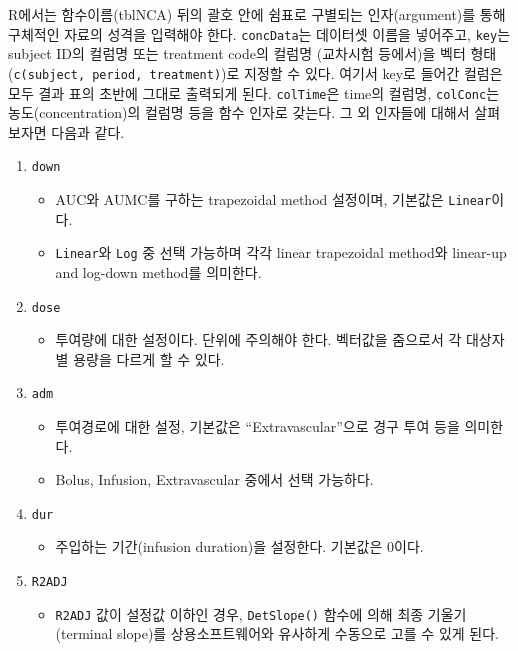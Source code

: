 \documentclass[
  11pt,
  krantz2, a4paper, twoside]{krantz}
\providecommand{\tightlist}{%
  \setlength{\itemsep}{0pt}\setlength{\parskip}{0pt}}
\theoremstyle{definition}
\theoremstyle{definition}
\theoremstyle{definition}
\theoremstyle{definition}
\theoremstyle{remark}
\begin{document}
R에서는 함수이름(tblNCA) 뒤의 괄호 안에 쉼표로 구별되는 인자(argument)를 통해 구체적인 자료의 성격을 입력해야 한다.
\texttt{concData}는 데이터셋 이름을 넣어주고, \texttt{key}는 subject ID의 컬럼명 또는 treatment code의 컬럼명 (교차시험 등에서)을 벡터 형태(\texttt{c(\textquotesingle{}subject\textquotesingle{},\ \textquotesingle{}period\textquotesingle{},\ \textquotesingle{}treatment\textquotesingle{})})로 지정할 수 있다. 여기서 key로 들어간 컬럼은 모두 결과 표의 초반에 그대로 출력되게 된다.
\texttt{colTime}은 time의 컬럼명, \texttt{colConc}는 농도(concentration)의 컬럼명 등을 함수 인자로 갖는다. 그 외 인자들에 대해서 살펴보자면 다음과 같다.

\begin{enumerate}
\def\labelenumi{\arabic{enumi}.}
\tightlist
\item
  \texttt{down}

  \begin{itemize}
  \tightlist
  \item
    AUC와 AUMC를 구하는 trapezoidal method 설정이며, 기본값은 \texttt{Linear}이다.
  \item
    \texttt{Linear}와 \texttt{Log} 중 선택 가능하며 각각 linear trapezoidal method와 linear-up and log-down method를 의미한다.
  \end{itemize}
\item
  \texttt{dose}

  \begin{itemize}
  \tightlist
  \item
    투여량에 대한 설정이다. 단위에 주의해야 한다. 벡터값을 줌으로서 각 대상자별 용량을 다르게 할 수 있다.
  \end{itemize}
\item
  \texttt{adm}

  \begin{itemize}
  \tightlist
  \item
    투여경로에 대한 설정, 기본값은 ``Extravascular''으로 경구 투여 등을 의미한다.
  \item
    Bolus, Infusion, Extravascular 중에서 선택 가능하다.
  \end{itemize}
\item
  \texttt{dur}

  \begin{itemize}
  \tightlist
  \item
    주입하는 기간(infusion duration)을 설정한다. 기본값은 0이다.
  \end{itemize}
\item
  \texttt{R2ADJ}

  \begin{itemize}
  \tightlist
  \item
    \texttt{R2ADJ} 값이 설정값 이하인 경우, \texttt{DetSlope()} 함수에 의해 최종 기울기(terminal slope)를 상용소프트웨어와 유사하게 수동으로 고를 수 있게 된다.
  \end{itemize}
\end{enumerate}
\end{document}
